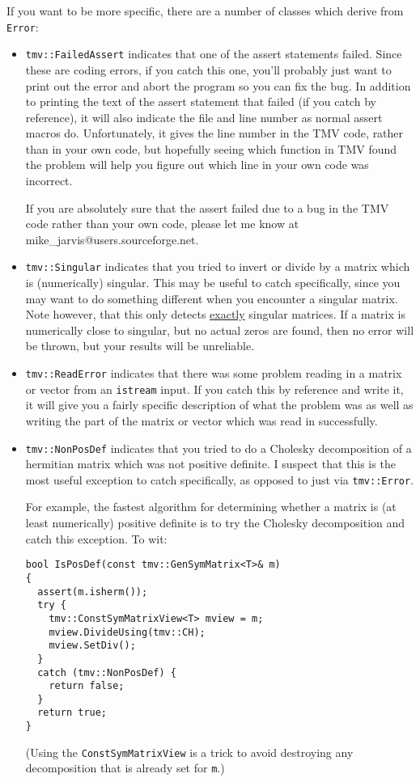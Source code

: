 \documentclass[twoside,letterpaper,11pt]{article}
\makeatletter
\renewcommand{\tt}[1]{{\texttt {#1}}}
\newcommand{\myemail}{mike\_jarvis@users.sourceforge.net}
\makeatother
\begin{document}
If you want to be more specific, there are a number of classes which derive from
\tt{Error}:
\begin{itemize}
\item
\tt{tmv::FailedAssert} indicates that one of the assert statements failed.
Since these are coding errors,
if you catch this one, you'll probably just want to print out the error and abort
the program so you can fix the bug.  In addition to printing the text of the
assert statement that failed (if you catch by reference), it will also indicate
the file and line number as normal assert macros do.  Unfortunately, it gives the 
line number in the TMV code, rather than in your own code, but hopefully seeing
which function in TMV found the problem will help you figure out which line
in your own code was incorrect.

If you are absolutely sure that the assert failed due to a bug in the TMV code
rather than your own code, please let me know at \myemail.

\item
\tt{tmv::Singular} indicates that you tried to invert or divide by a matrix
which is (numerically) singular.  This may be useful to catch specifically,
since you may want to do something different when you encounter a singular
matrix.  Note however, that this only detects \underline{exactly} singular
matrices.  If a matrix is numerically close to singular, but no actual 
zeros are found, then no error will be thrown, but your results will be 
unreliable.

\item
\tt{tmv::ReadError} indicates that there was some problem reading in a matrix or 
vector from an \tt{istream} input.  If you catch this by reference and write it,
it will give you a fairly specific description of what the problem was as well as
writing the part of the matrix or vector which was read in successfully.

\item
\tt{tmv::NonPosDef} indicates that you tried to do a Cholesky decomposition of
a hermitian matrix which was not positive definite.  I suspect that this is the 
most useful exception to catch specifically, as opposed to just via \tt{tmv::Error}.

For example, the fastest algorithm for determining whether a matrix is 
(at least numerically) positive definite is to try the Cholesky decomposition
and catch this exception.  To wit:
\begin{verbatim}
bool IsPosDef(const tmv::GenSymMatrix<T>& m)
{
  assert(m.isherm());
  try {
    tmv::ConstSymMatrixView<T> mview = m;
    mview.DivideUsing(tmv::CH);
    mview.SetDiv();
  }
  catch (tmv::NonPosDef) {
    return false;
  }
  return true;
}
\end{verbatim}
(Using the \tt{ConstSymMatrixView} is a trick to avoid destroying any decomposition
that is already set for \tt{m}.)


\end{itemize}
\end{document}
